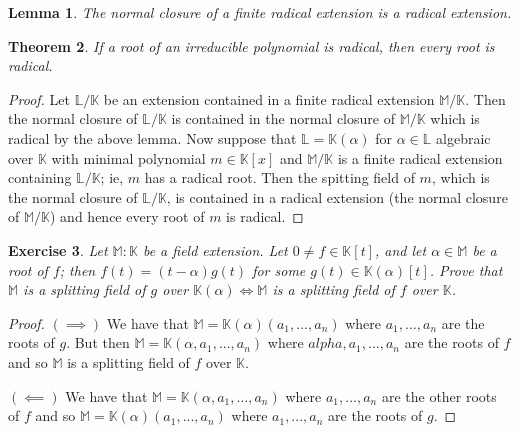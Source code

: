 \documentclass{article}
\newtheorem{theorem}{Theorem}[section]
\newtheorem{lemma}[theorem]{Lemma}
\newtheorem{exercise}[theorem]{Exercise}
\begin{document}
\begin{lemma}
The normal closure of a finite radical extension is a radical extension.
\end{lemma}

\begin{theorem}
If a root of an irreducible polynomial is radical, then every root is radical.
\end{theorem}
\begin{proof}
Let $\mathbb{L}/\mathbb{K}$ be an extension contained in a finite radical extension $\mathbb{M}/\mathbb{K}$. Then the normal closure of $\mathbb{L}/\mathbb{K}$ is contained in the normal closure of $\mathbb{M}/\mathbb{K}$ which is radical by the above lemma. Now suppose that $\mathbb{L}=\mathbb{K}(\alpha)$ for $\alpha\in\mathbb{L}$ algebraic over $\mathbb{K}$ with minimal polynomial $m\in\mathbb{K}[x]$ and $\mathbb{M}/\mathbb{K}$ is a finite radical extension containing $\mathbb{L}/\mathbb{K}$; ie, $m$ has a radical root. Then the spitting field of $m$, which is the normal closure of $\mathbb{L}/\mathbb{K}$, is contained in a radical extension (the normal closure of $\mathbb{M}/\mathbb{K}$) and hence every root of $m$ is radical.
\end{proof}


\begin{exercise}
Let $\mathbb{M}:\mathbb{K}$ be a field extension. Let $0\neq f\in\mathbb{K}[t]$, and let $\alpha\in\mathbb{M}$ be a root of $f$; then $f(t)=(t-\alpha)g(t)$ for some $g(t)\in\mathbb{K}(\alpha)[t]$. Prove that $\mathbb{M}$ is a splitting field of $g$ over $\mathbb{K}(\alpha)\iff\mathbb{M}$ is a splitting field of $f$ over $\mathbb{K}$.
\end{exercise}
\begin{proof}
$(\implies)$ We have that $\mathbb{M}=\mathbb{K}(\alpha)(a_1,...,a_n)$ where $a_1,...,a_n$ are the roots of $g$. But then $\mathbb{M}=\mathbb{K}(\alpha,a_1,...,a_n)$ where $alpha,a_1,...,a_n$ are the roots of $f$ and so $\mathbb{M}$ is a splitting field of $f$ over $\mathbb{K}$.

$(\impliedby)$ We have that $\mathbb{M}=\mathbb{K}(\alpha,a_1,...,a_n)$ where $a_1,...,a_n$ are the other roots of $f$ and so $\mathbb{M}=\mathbb{K}(\alpha)(a_1,...,a_n)$ where $a_1,...,a_n$ are the roots of $g$.
\end{proof}
\end{document}
